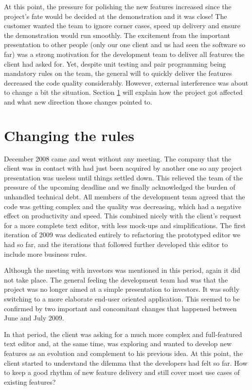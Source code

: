 \documentclass[lnbip]{svmultln}
\begin{document}
At this point, the pressure for polishing the new features increased
since the project's fate would be decided at the demonstration and it
was close! The customer wanted the team to ignore corner cases, speed
up delivery and ensure the demonstration would run smoothly. The
excitement from the important presentation to other people (only our
one client and us had seen the software so far) was a strong
motivation for the development team to deliver all features the client
had asked for. Yet, despite unit testing and pair programming being
mandatory rules on the team, the general will to quickly deliver the
features decreased the code quality considerably. However, external interference
was about to change a bit the situation. Section \ref{sec:changes} will explain
how the project got affected and what new direction those changes pointed to.

\section{Changing the rules}
\label{sec:changes}

December 2008 came and went without any meeting. The company that the
client was in contact with had just been acquired by another one so
any project presentation was useless until things settled down. This
relieved the team of the pressure of the upcoming deadline and we
finally acknowledged the burden of unhandled technical debt. All
members of the development team agreed that the code was getting
complex and the quality was decreasing, which had a negative effect on
productivity and speed. This combined nicely with the client's request
for a more complete text editor, with less mock-ups and
simplifications. The first iteration of 2009 was dedicated entirely to
refactoring the prototyped editor we had so far, and the iterations
that followed further developed this editor to include more business
rules.

Although the meeting with investors was mentioned in this period,
again it did not take place. The general feeling the development team
had was that the project was no longer aimed at a simple presentation
to investors. It was softly switching to a more elaborate end-user
oriented application. This seemed to be confirmed by two important and
concomitant changes that happened between June and July 2009.

In that period, the client was asking for a much more complex and
full-featured text editor and, at the same time, was exploring and
wanted to develop new features as an evolution and complement to his
previous idea. At this point, the client started to understand the
dilemma that the developers had felt so far.  How to keep a good
rhythm of new feature delivery and still cover most use cases of
existing features?
\end{document}
